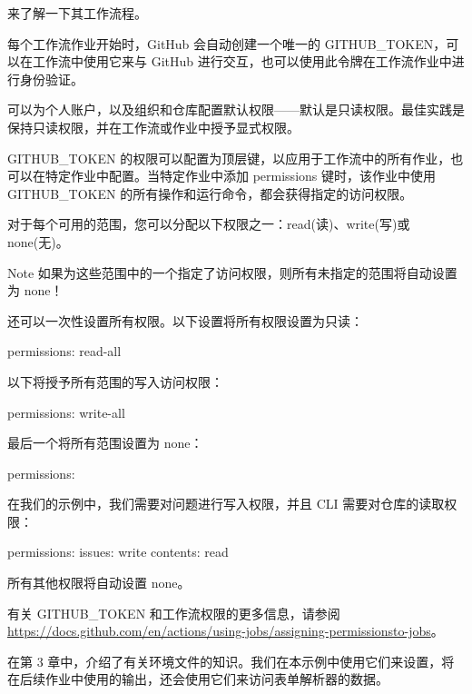 来了解一下其工作流程。


每个工作流作业开始时，GitHub 会自动创建一个唯一的 GITHUB\_TOKEN，可以在工作流中使用它来与 GitHub 进行交互，也可以使用此令牌在工作流作业中进行身份验证。

可以为个人账户，以及组织和仓库配置默认权限——默认是只读权限。最佳实践是保持只读权限，并在工作流或作业中授予显式权限。

GITHUB\_TOKEN 的权限可以配置为顶层键，以应用于工作流中的所有作业，也可以在特定作业中配置。当特定作业中添加 permissions 键时，该作业中使用 GITHUB\_TOKEN 的所有操作和运行命令，都会获得指定的访问权限。

对于每个可用的范围，您可以分配以下权限之一：read(读)、write(写)或 none(无)。

\begin{myNotic}{Note}
如果为这些范围中的一个指定了访问权限，则所有未指定的范围将自动设置为 none！
\end{myNotic}

还可以一次性设置所有权限。以下设置将所有权限设置为只读：

\begin{shell}
permissions: read-all
\end{shell}

以下将授予所有范围的写入访问权限：

\begin{shell}
permissions: write-all
\end{shell}

最后一个将所有范围设置为 none：

\begin{shell}
permissions: {}
\end{shell}

在我们的示例中，我们需要对问题进行写入权限，并且 CLI 需要对仓库的读取权限：

\begin{shell}
permissions:
  issues: write
  contents: read
\end{shell}

所有其他权限将自动设置 none。

有关 GITHUB\_TOKEN 和工作流权限的更多信息，请参阅 \url{https://docs.github.com/en/actions/using-jobs/assigning-permissionsto-jobs}。


在第 3 章中，介绍了有关环境文件的知识。我们在本示例中使用它们来设置，将在后续作业中使用的输出，还会使用它们来访问表单解析器的数据。

